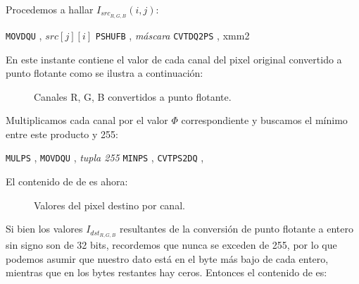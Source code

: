 Procedemos a hallar $I_{src_{R,G,B}}(i, j)$:

\begin{pseudocodigo}
    \STATE \texttt{MOVDQU} ,   $src[j][i]$      
    \STATE \texttt{PSHUFB} ,   \textit{máscara} 
    \STATE \texttt{CVTDQ2PS} , xmm{2}           
\end{pseudocodigo}

En este instante  contiene el valor de cada canal del pixel original
convertido a punto flotante como se ilustra a continuación:

\begin{figure}[H]
    \centering
    \caption{Canales R, G, B convertidos a punto flotante.}
\end{figure}

Multiplicamos cada canal por el valor $\Phi$ correspondiente y buscamos
el mínimo entre este producto y 255:

\begin{pseudocodigo}
    \STATE \texttt{MULPS}    ,  
    \STATE \texttt{MOVDQU}   , \textit{tupla 255}
    \STATE \texttt{MINPS}    , 
    \STATE \texttt{CVTPS2DQ} ,  
\end{pseudocodigo}

El contenido de de  es ahora:

\begin{figure}[H]
    \centering
    \caption{Valores del pixel destino por canal.}
\end{figure}

Si bien los valores $I_{dst_{R,G,B}}$ resultantes de la conversión de punto flotante a
entero sin signo son de 32 bits, recordemos que nunca se exceden de 255, por lo que podemos
asumir que nuestro dato está en el byte más bajo de cada entero, mientras que en los bytes
restantes hay ceros. Entonces el contenido de  es:


